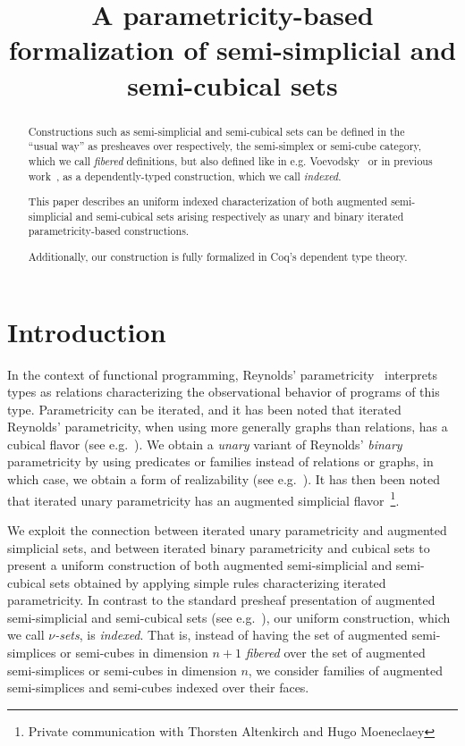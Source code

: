 \documentclass[10pt]{art.cls/art}
\title{A parametricity-based formalization of semi-simplicial and semi-cubical sets}
\author{\IEEEauthorblockN{Hugo Herbelin \\ and Ramkumar Ramachandra} \IEEEauthorblockA{Université Paris Cité, Inria, CNRS, IRIF, Paris}}
\begin{document}
\maketitle
\begin{abstract}
  Constructions such as semi-simplicial and semi-cubical sets can be defined in the ``usual way'' as presheaves over respectively, the semi-simplex or semi-cube category, which we call \emph{fibered} definitions, but also defined like in e.g. Voevodsky~\cite{voevodsky12} or in previous work~\cite{herbelin15}, as a dependently-typed construction, which we call \emph{indexed}. %

  This paper describes an uniform indexed characterization of both augmented semi-simplicial and semi-cubical sets arising respectively as unary and binary iterated parametricity-based constructions.

  Additionally, our construction is fully formalized in Coq's dependent type theory.
\end{abstract}

\section{Introduction}
In the context of functional programming, Reynolds' parametricity~\cite{reynolds72} interprets types as relations characterizing the observational behavior of programs of this type. Parametricity can be iterated, and it has been noted that iterated Reynolds' parametricity, when using more generally graphs than relations, has a cubical flavor (see e.g.~\cite{johann17,altenkirch15,moulin16,moeneclaey21,moeneclaey22phd}). We obtain a \emph{unary} variant of Reynolds' \emph{binary} parametricity by using predicates or families instead of relations or graphs, in which case, we obtain a form of realizability (see e.g.~\cite{bernardy12,lasson12,moulin16}). It has then been noted that iterated unary parametricity has an augmented simplicial flavor~\footnote{Private communication with Thorsten Altenkirch and Hugo Moeneclaey}. %

We exploit the connection between iterated unary parametricity and augmented simplicial sets, and between iterated binary parametricity and cubical sets to present a uniform construction of both augmented semi-simplicial and semi-cubical sets obtained by applying simple rules characterizing iterated parametricity. In contrast to the standard presheaf presentation of augmented semi-simplicial and semi-cubical sets (see e.g.~\cite{fri08,grandis03,buchholtz17}), our uniform construction, which we call \emph{$\nu$-sets}, is \emph{indexed}. That is, instead of having the set of augmented semi-simplices or semi-cubes in dimension $n+1$ \emph{fibered} over the set of augmented semi-simplices or semi-cubes in dimension $n$, we consider families of augmented semi-simplices and semi-cubes indexed over their faces.
\end{document}
